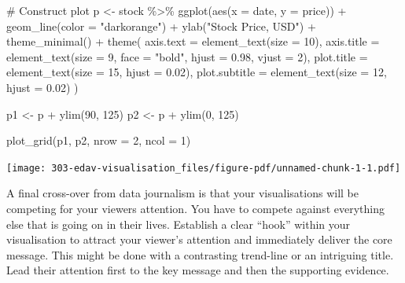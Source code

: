 \documentclass[
  letterpaper,
  DIV=11,
  numbers=noendperiod]{scrreprt}
\newenvironment{Shaded}{\begin{snugshade}}{\end{snugshade}}
\newcommand{\AttributeTok}[1]{\textcolor[rgb]{0.40,0.45,0.13}{#1}}
\newcommand{\CommentTok}[1]{\textcolor[rgb]{0.37,0.37,0.37}{#1}}
\newcommand{\DecValTok}[1]{\textcolor[rgb]{0.68,0.00,0.00}{#1}}
\newcommand{\FloatTok}[1]{\textcolor[rgb]{0.68,0.00,0.00}{#1}}
\newcommand{\FunctionTok}[1]{\textcolor[rgb]{0.28,0.35,0.67}{#1}}
\newcommand{\NormalTok}[1]{\textcolor[rgb]{0.00,0.23,0.31}{#1}}
\newcommand{\OtherTok}[1]{\textcolor[rgb]{0.00,0.23,0.31}{#1}}
\newcommand{\SpecialCharTok}[1]{\textcolor[rgb]{0.37,0.37,0.37}{#1}}
\newcommand{\StringTok}[1]{\textcolor[rgb]{0.13,0.47,0.30}{#1}}
\begin{document}
\begin{Shaded}
\begin{Highlighting}[]
\CommentTok{\# Construct plot}
\NormalTok{p }\OtherTok{\textless{}{-}}\NormalTok{ stock }\SpecialCharTok{\%\textgreater{}\%} 
  \FunctionTok{ggplot}\NormalTok{(}\FunctionTok{aes}\NormalTok{(}\AttributeTok{x =}\NormalTok{ date, }\AttributeTok{y =}\NormalTok{ price)) }\SpecialCharTok{+}
  \FunctionTok{geom\_line}\NormalTok{(}\AttributeTok{color =} \StringTok{"darkorange"}\NormalTok{) }\SpecialCharTok{+} 
  \FunctionTok{ylab}\NormalTok{(}\StringTok{"Stock Price, USD"}\NormalTok{) }\SpecialCharTok{+}
  \FunctionTok{theme\_minimal}\NormalTok{() }\SpecialCharTok{+}
  \FunctionTok{theme}\NormalTok{(}
    \AttributeTok{axis.text =} \FunctionTok{element\_text}\NormalTok{(}\AttributeTok{size =} \DecValTok{10}\NormalTok{),}
    \AttributeTok{axis.title =} \FunctionTok{element\_text}\NormalTok{(}\AttributeTok{size =} \DecValTok{9}\NormalTok{, }\AttributeTok{face =} \StringTok{"bold"}\NormalTok{,  }\AttributeTok{hjust =} \FloatTok{0.98}\NormalTok{, }\AttributeTok{vjust =} \DecValTok{2}\NormalTok{),}
    \AttributeTok{plot.title =} \FunctionTok{element\_text}\NormalTok{(}\AttributeTok{size =} \DecValTok{15}\NormalTok{, }\AttributeTok{hjust =} \FloatTok{0.02}\NormalTok{),}
    \AttributeTok{plot.subtitle =} \FunctionTok{element\_text}\NormalTok{(}\AttributeTok{size =} \DecValTok{12}\NormalTok{, }\AttributeTok{hjust =} \FloatTok{0.02}\NormalTok{)}
\NormalTok{  )}

\NormalTok{p1 }\OtherTok{\textless{}{-}}\NormalTok{ p }\SpecialCharTok{+} \FunctionTok{ylim}\NormalTok{(}\DecValTok{90}\NormalTok{, }\DecValTok{125}\NormalTok{)}
\NormalTok{p2 }\OtherTok{\textless{}{-}}\NormalTok{ p }\SpecialCharTok{+} \FunctionTok{ylim}\NormalTok{(}\DecValTok{0}\NormalTok{, }\DecValTok{125}\NormalTok{)}

\FunctionTok{plot\_grid}\NormalTok{(p1, p2, }\AttributeTok{nrow =} \DecValTok{2}\NormalTok{, }\AttributeTok{ncol =} \DecValTok{1}\NormalTok{)}
\end{Highlighting}
\end{Shaded}

\texttt{[image: 303-edav-visualisation\_files/figure-pdf/unnamed-chunk-1-1.pdf]}

A final cross-over from data journalism is that your visualisations will
be competing for your viewers attention. You have to compete against
everything else that is going on in their lives. Establish a clear
``hook'' within your visualisation to attract your viewer's attention
and immediately deliver the core message. This might be done with a
contrasting trend-line or an intriguing title. Lead their attention
first to the key message and then the supporting evidence.
\end{document}
